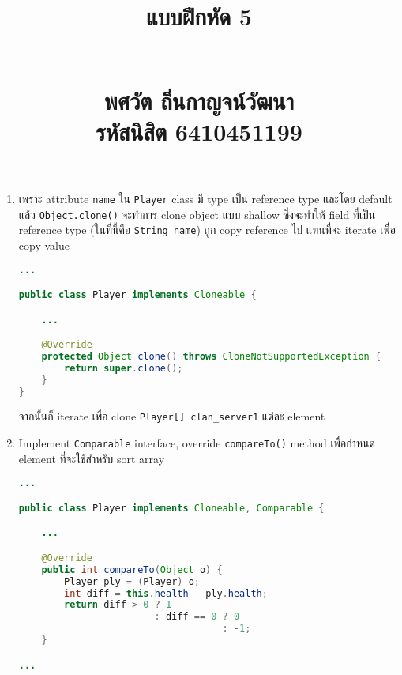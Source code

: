 \documentclass{article}
\title{\flushleft\Large แบบฝึกหัด 5\\
\rule{0em}{1ex}\\
\normalsize พศวัต ถิ่นกาญจน์วัฒนา\\
รหัสนิสิต 6410451199
\vspace{-8ex}}
\author{}
\date{}
\begin{document}
\maketitle
\sloppy\flushleft
\begin{enumerate}
    \item เพราะ attribute \texttt{name} ใน \texttt{Player} class มี type เป็น reference type และโดย default แล้ว \texttt{Object.clone()} จะทำการ clone object แบบ shallow ซึ่งจะทำให้ field ที่เป็น reference type (ในที่นี้คือ \texttt{String name}) ถูก copy reference ไป แทนที่จะ iterate เพื่อ copy value
    \begin{lstlisting}[language=Java,numbers=none,frame=none,title={Player.java}]
...

public class Player implements Cloneable {

    ...

    @Override
    protected Object clone() throws CloneNotSupportedException {
        return super.clone();
    }
}
    \end{lstlisting}

จากนั้นก็ iterate เพื่อ clone \texttt{Player[] clan\_server1} แต่ละ element

    \item Implement \texttt{Comparable} interface, override \texttt{compareTo()} method เพื่อกำหนด element ที่จะใช้สำหรับ sort array
    \begin{lstlisting}[language=Java,numbers=none,frame=none,title={Player.java}]
...

public class Player implements Cloneable, Comparable {

    ...

    @Override
    public int compareTo(Object o) {
        Player ply = (Player) o;
        int diff = this.health - ply.health;
        return diff > 0 ? 1
                        : diff == 0 ? 0
                                    : -1;
    }

...
    \end{lstlisting}
\end{enumerate}
\end{document}
